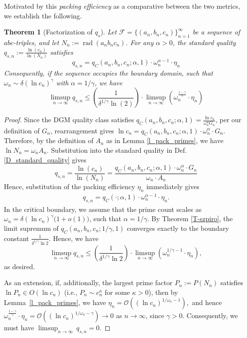 \documentclass[11pt,letterpaper]{amsart}
\newtheorem{theorem}{Theorem}[section]
\def\ra{\rightarrow}
\begin{document}
Motivated by this \textit{packing efficiency} as a comparative between the two metrics, we establish the following.

\begin{theorem}[Factorization of $q_s$]
\label{t-big}
Let $\mathcal{F} = \{(a_n, b_n, c_n)\}_{n=1}^\infty$ be a sequence of $abc$-triples, and let $N_n := \operatorname{rad}(a_n b_n c_n)$. For any $\alpha > 0$, the standard quality $q_{s,n} := \frac{\ln (c_n)}{\ln (N_n)}$ satisfies
\[
    q_{s,n} = q_C(a_n, b_n, c_n; \alpha, 1) \cdot \omega_n^{\alpha - 1} \cdot \eta_n
\]
Consequently, if the sequence occupies the boundary domain, such that $\omega_n \sim \delta (\ln c_n)^\gamma$ with $\alpha = 1/\gamma$, we have
\[
    \limsup_{n \to \infty} q_{s,n} \le \left( \frac{1}{\delta^{1/\gamma} \ln(2)} \right) \cdot \limsup_{n \to \infty} \left( \omega_n^{\frac{1-\gamma}{\gamma}} \cdot \eta_n \right)
\]
\end{theorem}

\begin{proof}
Since the DGM quality class satisfies $q_C(a_n, b_n, c_n; \alpha, 1) = \frac{\ln c_n}{\omega_n^\alpha G_n}$, per our definition of $G_n$, rearrangement gives $\ln c_n = q_C(a_n, b_n, c_n; \alpha, 1) \cdot \omega_n^\alpha \cdot G_n$. Therefore, by the definition of $A_n$ as in Lemma \ref{l_pack_primes}, we have $\ln N_n = \omega_n A_n$. Substitution into the standard quality in Def. \ref{D_standard_quality} gives
\[
    q_{s,n} = \frac{\ln (c_n)}{\ln (N_n)} = \frac{q_C(a_n, b_n, c_n; \alpha, 1) \cdot \omega_n^\alpha \cdot G_n}{\omega_n \cdot A_n}
\]
Hence, substitution of the packing efficiency $\eta_n$ immediately gives
\begin{align*}
    q_{s,n} = q_C(\cdot; \alpha, 1) \cdot \omega_n^{\alpha - 1} \cdot \eta_n.
\end{align*}
In the critical boundary, we assume that the prime count scales as $\omega_n = \delta (\ln c_n)^\gamma \bigl(1 + o(1)\bigr)$, such that $\alpha = 1/\gamma$. By Theorem \ref{T-szpiro}, the limit supremum of $q_C(a_n, b_n, c_n; 1/\gamma, 1)$ converges exactly to the boundary constant $\frac{1}{\delta^{1/\gamma} \ln 2}$. Hence, we have
\[
    \limsup_{n \to \infty} q_{s,n} \le \left( \frac{1}{\delta^{1/\gamma} \ln 2} \right) \cdot \limsup_{n \to \infty} \left( \omega_n^{1/\gamma - 1} \cdot \eta_n \right),
\]
as desired.

As an extension, if, additionally, the largest prime factor 
$P_n := P(N_n)$ satisfies $\ln P_n \in O(\ln c_n)$ (i.e., $P_n \sim c_n^\kappa$ 
for some $\kappa > 0$), then by Lemma~\ref{l_pack_primes}, we have $\eta_n = \mathcal{O}\!\left((\ln c_n)^{1/\omega_n - 1}\right),$ and hence $ \omega_n^{\frac{1-\gamma}{\gamma}}\cdot\eta_n 
=\mathcal{O}\left((\ln c_n)^{1/\omega_n - \gamma}\right) \ra 0$ as $n\to\infty$, since $\gamma > 0$. Consequently, we must have $ \limsup_{n\to\infty}\, q_{s,n}= 0.$
\end{proof}
\end{document}

